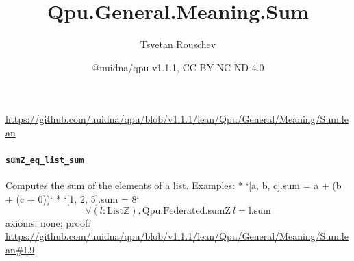 \documentclass[11pt]{article}
\title{Qpu.General.Meaning.Sum}
\author{Tsvetan Rouschev}
\date{@uuidna/qpu v1.1.1, CC-BY-NC-ND-4.0}
\begin{document}
\maketitle
\noindent\url{https://github.com/uuidna/qpu/blob/v1.1.1/lean/Qpu/General/Meaning/Sum.lean}

\paragraph{\texttt{sumZ\_eq\_list\_sum}}
Computes the sum of the elements of a list.  Examples: * `[a, b, c].sum = a + (b + (c + 0))` * `[1, 2, 5].sum = 8`
\[ \forall (l : \mathrm{List} \mathbb{Z}), \mathrm{Qpu.Federated.sumZ}\ l = \mathrm{l.sum} \]
\noindent axioms: none; proof: \url{https://github.com/uuidna/qpu/blob/v1.1.1/lean/Qpu/General/Meaning/Sum.lean\#L9}
\end{document}
